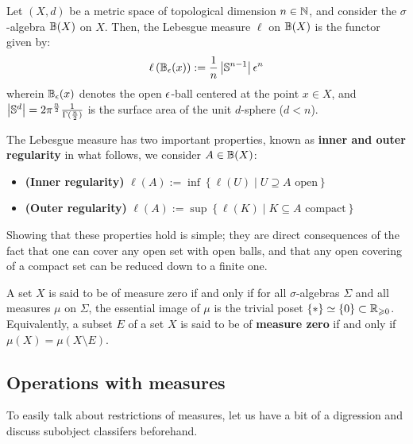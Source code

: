         \begin{example}
            Let $(X,d)$ be a metric space of topological dimension $n \in \mathbb{N}$, and consider the $\sigma$-algebra $\mathbb{B}(X)$ on $X$. Then, the Lebesgue measure $\ell$ on $\mathbb{B}(X)$ is the functor given by:
                $$\ell\left(\mathbb{B}_{\epsilon}(x)\right) := \frac1n \left|\mathbb{S}^{n-1}\right| \epsilon^n$$
            wherein $\mathbb{B}_{\epsilon}(x)$ denotes the open $\epsilon$-ball centered at the point $x \in X$, and $\left|\mathbb{S}^d\right| = 2\pi^{\frac{n}{2}} \frac{1}{\Gamma(\frac{n}{2})}$ is the surface area of the unit $d$-sphere ($d < n$).

            The Lebesgue measure has two important properties, known as \textbf{inner and outer regularity} in what follows, we consider $A \in \mathbb{B}(X)$:
                \begin{itemize}
                    \item \textbf{(Inner regularity)} $\ell(A) := \inf\left\{\ell(U) \mid \text{$U \supseteq A$ open}\right\}$
                    \item \textbf{(Outer regularity)} $\ell(A) := \sup\left\{\ell(K) \mid \text{$K \subseteq A$ compact}\right\}$
                \end{itemize}
            Showing that these properties hold is simple; they are direct consequences of the fact that one can cover any open set with open balls, and that any open covering of a compact set can be reduced down to a finite one.
        \end{example}
        \begin{definition} \label{def: measure_zero_set}
            A set $X$ is said to be of measure zero if and only if for all $\sigma$-algebras $\Sigma$ and all measures $\mu$ on $\Sigma$, the essential image of $\mu$ is the trivial poset $\{*\} \simeq \{0\} \subset \mathbb{R}_{\geqslant 0}$. Equivalently, a subset $E$ of a set $X$ is said to be of \textbf{measure zero} if and only if $\mu(X) = \mu(X \setminus E)$.
        \end{definition}

    \subsection{Operations with measures}
        To easily talk about restrictions of measures, let us have a bit of a digression and discuss subobject classifers beforehand.
        
